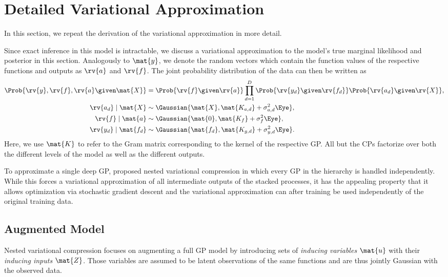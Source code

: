 \documentclass{article}
\begin{document}
\nocite{*}
\printbibliography


\newpage
\appendix
\section{Detailed Variational Approximation}
\label{app:sec:variational_approximation}
In this section, we repeat the derivation of the variational approximation in more detail.

Since exact inference in this model is intractable, we discuss a variational approximation to the model's true marginal likelihood and posterior in this section.
Analogously to $\mat{y}$, we denote the random vectors which contain the function values of the respective functions and outputs as $\rv{a}$ and $\rv{f}$.
The joint probability distribution of the data can then be written as
\begin{align}
\begin{split}
    \label{app:eq:full_model}
    \Prob{\rv{y}, \rv{f}, \rv{a} \given \mat{X}} &=
    \Prob{\rv{f} \given \rv{a}} \prod_{d=1}^D \Prob{\rv{y_d} \given \rv{f_d}}\Prob{\rv{a_d} \given \rv{X}}, \\
    \rv{a_d} \mid \mat{X} &\sim \Gaussian{\mat{X}, \mat{K_{a, d}} + \sigma^2_{a, d}\Eye}, \\
    \rv{f} \mid \mat{a} &\sim \Gaussian{\mat{0}, \mat{K_f} + \sigma^2_f\Eye}, \\
    \rv{y_d} \mid \mat{f_d} &\sim \Gaussian{\mat{f_d}, \mat{K_{g, d}} + \sigma^2_{y, d}\Eye}.
\end{split}
\end{align}
Here, we use $\mat{K}$ to refer to the Gram matrix corresponding to the kernel of the respective GP.
All but the CPs factorize over both the different levels of the model as well as the different outputs.

To approximate a single deep GP, \Textcite{hensman_nested_2014} proposed nested variational compression in which every GP in the hierarchy is handled independently.
While this forces a variational approximation of all intermediate outputs of the stacked processes, it has the appealing property that it allows optimization via stochastic gradient descent \parencite{hensman_gaussian_2013} and the variational approximation can after training be used independently of the original training data.

\subsection{Augmented Model}
\label{app:subsec:augmented_model}
Nested variational compression focuses on augmenting a full GP model by introducing sets of \emph{inducing variables} $\mat{u}$ with their \emph{inducing inputs} $\mat{Z}$.
Those variables are assumed to be latent observations of the same functions and are thus jointly Gaussian with the observed data.
\end{document}
